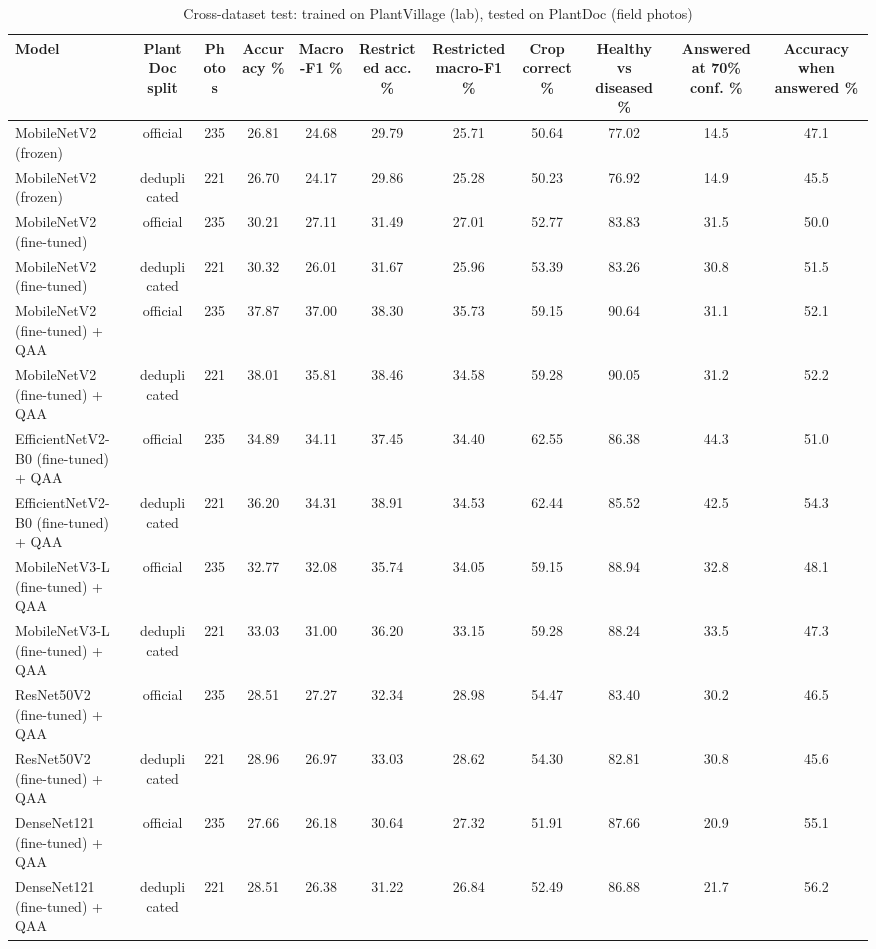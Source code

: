 \begin{table}[t]
\centering
\small
\caption{Cross-dataset test: trained on PlantVillage (lab), tested on PlantDoc (field photos)}
\label{tab:table_cross_dataset}
\begin{tabular}{lcccccccccc}
\toprule
Model & PlantDoc split & Photos & Accuracy \% & Macro-F1 \% & Restricted acc. \% & Restricted macro-F1 \% & Crop correct \% & Healthy vs diseased \% & Answered at 70\% conf. \% & Accuracy when answered \% \\
\midrule
MobileNetV2 (frozen) & official & 235 & 26.81 & 24.68 & 29.79 & 25.71 & 50.64 & 77.02 & 14.5 & 47.1 \\
MobileNetV2 (frozen) & deduplicated & 221 & 26.70 & 24.17 & 29.86 & 25.28 & 50.23 & 76.92 & 14.9 & 45.5 \\
MobileNetV2 (fine-tuned) & official & 235 & 30.21 & 27.11 & 31.49 & 27.01 & 52.77 & 83.83 & 31.5 & 50.0 \\
MobileNetV2 (fine-tuned) & deduplicated & 221 & 30.32 & 26.01 & 31.67 & 25.96 & 53.39 & 83.26 & 30.8 & 51.5 \\
MobileNetV2 (fine-tuned) + QAA & official & 235 & 37.87 & 37.00 & 38.30 & 35.73 & 59.15 & 90.64 & 31.1 & 52.1 \\
MobileNetV2 (fine-tuned) + QAA & deduplicated & 221 & 38.01 & 35.81 & 38.46 & 34.58 & 59.28 & 90.05 & 31.2 & 52.2 \\
EfficientNetV2-B0 (fine-tuned) + QAA & official & 235 & 34.89 & 34.11 & 37.45 & 34.40 & 62.55 & 86.38 & 44.3 & 51.0 \\
EfficientNetV2-B0 (fine-tuned) + QAA & deduplicated & 221 & 36.20 & 34.31 & 38.91 & 34.53 & 62.44 & 85.52 & 42.5 & 54.3 \\
MobileNetV3-L (fine-tuned) + QAA & official & 235 & 32.77 & 32.08 & 35.74 & 34.05 & 59.15 & 88.94 & 32.8 & 48.1 \\
MobileNetV3-L (fine-tuned) + QAA & deduplicated & 221 & 33.03 & 31.00 & 36.20 & 33.15 & 59.28 & 88.24 & 33.5 & 47.3 \\
ResNet50V2 (fine-tuned) + QAA & official & 235 & 28.51 & 27.27 & 32.34 & 28.98 & 54.47 & 83.40 & 30.2 & 46.5 \\
ResNet50V2 (fine-tuned) + QAA & deduplicated & 221 & 28.96 & 26.97 & 33.03 & 28.62 & 54.30 & 82.81 & 30.8 & 45.6 \\
DenseNet121 (fine-tuned) + QAA & official & 235 & 27.66 & 26.18 & 30.64 & 27.32 & 51.91 & 87.66 & 20.9 & 55.1 \\
DenseNet121 (fine-tuned) + QAA & deduplicated & 221 & 28.51 & 26.38 & 31.22 & 26.84 & 52.49 & 86.88 & 21.7 & 56.2 \\

\end{tabular}
\end{table}
